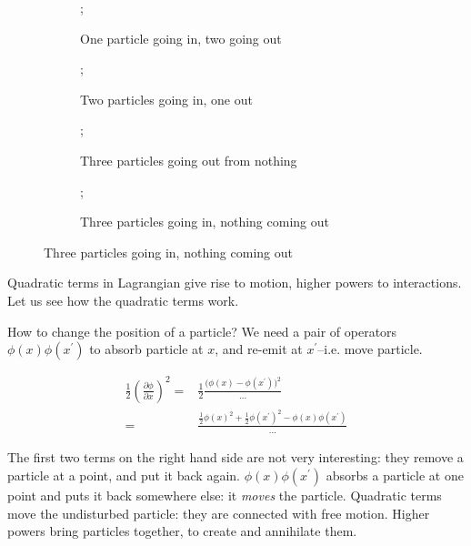 \documentclass[]{article}
\begin{document}
\begin{figure}[H]
	\caption{$\phi^3(x)$ gives rise to many possible interactions.}\label{fig:phi:3:x}
	\begin{subfigure}[t]{0.2\textwidth}
		\caption{One particle going in, two going out}
		;
	\end{subfigure}
	\hfill
	\begin{subfigure}[t]{0.2\textwidth}
		\caption{Two particles going in, one out}
		;
	\end{subfigure}
	\hfill
	\begin{subfigure}[t]{0.2\textwidth}
		\caption{Three particles going out from nothing}
		;
	\end{subfigure}
	\hfill
	\begin{subfigure}[t]{0.2\textwidth}
		\caption{Three particles going in, nothing coming out}
		;
	\end{subfigure}
\end{figure}
Quadratic terms in Lagrangian give rise to motion, higher powers to interactions. Let us see how the quadratic terms work.

How to change the position of a particle? We need a pair of operators $\phi(x) \phi(x^\prime)$ to absorb particle at $x$, and re-emit at $x^\prime$--i.e. move particle.

\begin{align*}
	\frac{1}{2}(\frac{\partial \phi}{\partial x})^2 =& \frac{1}{2}\frac{\big( \phi(x) - \phi(x^\prime)\big)^2}{...}\\
	=& \frac{\frac{1}{2}\phi(x)^2 + \frac{1}{2}\phi(x^\prime)^2 -  \phi(x) \phi(x^\prime)}{...}
\end{align*}

The first two terms on the right hand side are not very interesting: they remove a particle at a point, and put it back again. $\phi(x) \phi(x^\prime)$ absorbs a particle at one point and puts it back somewhere else: it \emph{moves} the particle. Quadratic terms move the undisturbed particle: they are connected with free motion. Higher powers bring particles together, to create and annihilate them.
\end{document}

